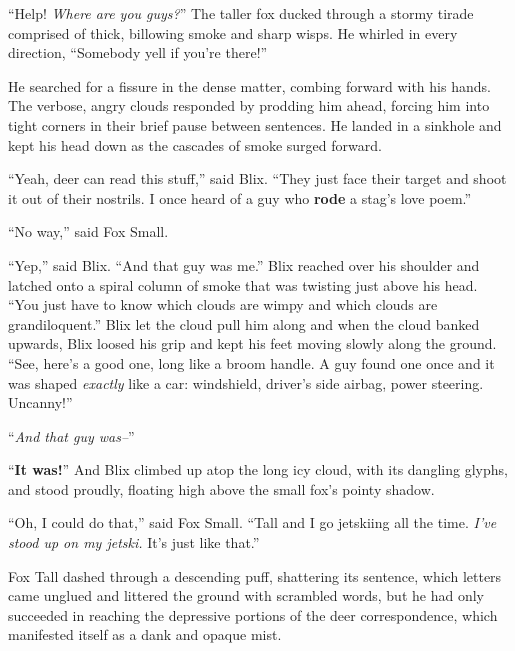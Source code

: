 \documentclass[10pt,twoside]{report}
\begin{document}
``Help!  {\em Where are you guys?}''  The taller fox ducked through a
stormy tirade comprised of thick, billowing smoke and sharp wisps.  He
whirled in every direction, ``Somebody yell if you're there!''

He searched for a fissure in the dense matter, combing forward with
his hands.  The verbose, angry clouds responded by prodding him ahead,
forcing him into tight corners in their brief pause between sentences.
He landed in a sinkhole and kept his head down as the cascades of
smoke surged forward.

``Yeah, deer can read this stuff,'' said Blix.  ``They just face their
target and shoot it out of their nostrils.  I once heard of a guy who
{\bf rode} a stag's love poem.''

``No way,'' said Fox Small.

``Yep,'' said Blix.  ``And that guy was me.''  Blix reached over his
shoulder and latched onto a spiral column of smoke that was twisting
just above his head.  ``You just have to know which clouds are wimpy
and which clouds are grandiloquent.''  Blix let the cloud pull him
along and when the cloud banked upwards, Blix loosed his grip and kept
his feet moving slowly along the ground.  ``See, here's a good one,
long like a broom handle.  A guy found one once and it was shaped {\em
  exactly} like a car: windshield, driver's side airbag, power
steering. Uncanny!''

``{\em And that guy was--}''

``{\bf It was!}''  And Blix climbed up atop the long icy cloud, with
its dangling glyphs, and stood proudly, floating high above the small
fox's pointy shadow.

``Oh, I could do that,'' said Fox Small.  ``Tall and I go jetskiing
all the time.  {\em I've stood up on my jetski.}  It's just like
that.''

Fox Tall dashed through a descending puff, shattering its sentence,
which letters came unglued and littered the ground with scrambled
words, but he had only succeeded in reaching the depressive portions
of the deer correspondence, which manifested itself as a dank and
opaque mist.
\end{document}
